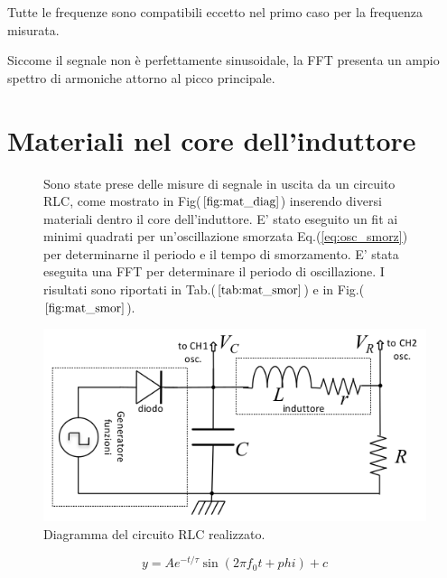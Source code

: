 \documentclass{article}
\begin{document}
    Tutte le frequenze sono compatibili eccetto nel primo caso per la frequenza 
    misurata.

    Siccome il segnale non è perfettamente sinusoidale, la FFT
    presenta un ampio spettro di armoniche attorno al picco principale.

\section{Materiali nel core dell'induttore}
        \begin{figure}[H]
            \begin{minipage}{0.45\textwidth}
                Sono state prese delle misure di segnale in uscita da un circuito RLC,
                come mostrato in Fig($\ref{fig:mat_diag}$) inserendo diversi materiali dentro 
                il core dell'induttore.
                E' stato eseguito un fit ai minimi quadrati per un'oscillazione 
                smorzata Eq.(\ref{eq:osc_smorz}) per determinarne il periodo e il tempo di smorzamento.
                E' stata eseguita una FFT per determinare il periodo di oscillazione.
                I risultati sono riportati in Tab.($\ref{tab:mat_smor}$) e 
                in Fig.($\ref{fig:mat_smor}$).
            \end{minipage}
            \hfill
            \begin{minipage}{0.45\textwidth}
                \includegraphics[width=\textwidth]{FFT13/RLCmaterialsdiagram.png}
                \caption{Diagramma del circuito RLC realizzato.}
                \label{fig:mat_diag}
            \end{minipage}
        \end{figure}

        \begin{equation}
            y=A e^{-t/\tau} \sin(2 \pi f_0 t + phi) +c
            \label{eq:osc_smorz}
        \end{equation}
\end{document}
